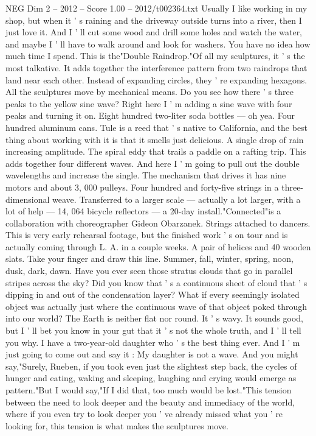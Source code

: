 \begin{textsample}{NEG Dim 2 – 2012 – Score 1.00 – 2012/t002364.txt}  \label{ex:f2_neg_026}
Usually I like working in my shop, but when it ' s raining and the driveway outside turns into a river, then I just love it.
And I ' ll cut some wood and drill some holes and watch the water, and maybe I ' ll have to walk around and look for washers.
You have no idea how much time I spend.
This is the"Double Raindrop."Of all my sculptures, it ' s the most talkative.
It adds together the interference pattern from two raindrops that land near each other.
Instead of expanding circles, they ' re expanding hexagons.
All the sculptures move by mechanical means.
Do you see how there ' s three peaks to the yellow sine wave?
Right here I ' m adding a sine wave with four peaks and turning it on.
Eight hundred two-liter soda bottles — oh yea.
Four hundred aluminum cans.
Tule is a reed that ' s native to California, and the best thing about working with it is that it smells just delicious.
A single drop of rain increasing amplitude.
The spiral eddy that trails a paddle on a rafting trip.
This adds together four different waves.
And here I ' m going to pull out the double wavelengths and increase the single.
The mechanism that drives it has nine motors and about 3, 000 pulleys.
Four hundred and forty-five strings in a three-dimensional weave.
Transferred to a larger scale — actually a lot larger, with a lot of help — 14, 064 bicycle reflectors — a 20-day install."Connected"is a collaboration with choreographer Gideon Obarzanek.
Strings attached to dancers.
This is very early rehearsal footage, but the finished work ' s on tour and is actually coming through L.
A. in a couple weeks.
A pair of helices and 40 wooden slats.
Take your finger and draw this line.
Summer, fall, winter, spring, noon, dusk, dark, dawn.
Have you ever seen those stratus clouds that go in parallel stripes across the sky?
Did you know that ' s a continuous sheet of cloud that ' s dipping in and out of the condensation layer?
What if every seemingly isolated object was actually just where the continuous wave of that object poked through into our world?
The Earth is neither flat nor round.
It ' s wavy.
It sounds good, but I ' ll bet you know in your gut that it ' s not the whole truth, and I ' ll tell you why.
I have a two-year-old daughter who ' s the best thing ever.
And I ' m just going to come out and say it : My daughter is not a wave.
And you might say,"Surely, Rueben, if you took even just the slightest step back, the cycles of hunger and eating, waking and sleeping, laughing and crying would emerge as pattern."But I would say,"If I did that, too much would be lost."This tension between the need to look deeper and the beauty and immediacy of the world, where if you even try to look deeper you ' ve already missed what you ' re looking for, this tension is what makes the sculptures move.

\end{textsample}
